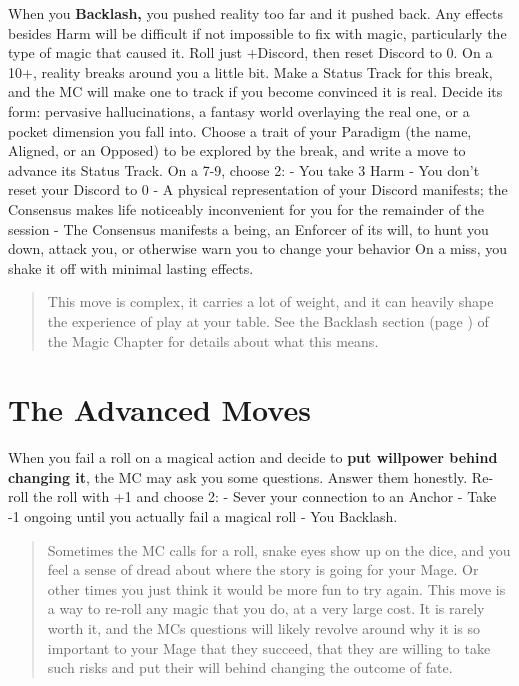 \documentclass[
  oneside,
  statementpaper,
  9pt]{memoir}
\begin{document}
When you \textbf{Backlash,} you pushed reality too far and it pushed
back. Any effects besides Harm will be difficult if not impossible to
fix with magic, particularly the type of magic that caused it. Roll just
+Discord, then reset Discord to 0. On a 10+, reality breaks around you a
little bit. Make a Status Track for this break, and the MC will make one
to track if you become convinced it is real. Decide its form: pervasive
hallucinations, a fantasy world overlaying the real one, or a pocket
dimension you fall into. Choose a trait of your Paradigm (the name,
Aligned, or an Opposed) to be explored by the break, and write a move to
advance its Status Track. On a 7-9, choose 2: - You take 3 Harm - You
don't reset your Discord to 0 - A physical representation of your
Discord manifests; the Consensus makes life noticeably inconvenient for
you for the remainder of the session - The Consensus manifests a being,
an Enforcer of its will, to hunt you down, attack you, or otherwise warn
you to change your behavior On a miss, you shake it off with minimal
lasting effects.

\begin{quote}
This move is complex, it carries a lot of weight, and it can heavily shape the experience of play at your table. See the Backlash section (page \pageref{Backlash section}) of the Magic Chapter for details about what this means.
\end{quote}

\hypertarget{the-advanced-moves}{%
\section{The Advanced Moves}\label{the-advanced-moves}}

When you fail a roll on a magical action and decide to \textbf{put
willpower behind changing it}, the MC may ask you some questions. Answer
them honestly. Re-roll the roll with +1 and choose 2: - Sever your
connection to an Anchor - Take -1 ongoing until you actually fail a
magical roll - You Backlash.

\begin{quote}
Sometimes the MC calls for a roll, snake eyes show up on the dice, and
you feel a sense of dread about where the story is going for your Mage.
Or other times you just think it would be more fun to try again. This
move is a way to re-roll any magic that you do, at a very large cost. It
is rarely worth it, and the MCs questions will likely revolve around why
it is so important to your Mage that they succeed, that they are willing
to take such risks and put their will behind changing the outcome of
fate.
\end{quote}
\end{document}
